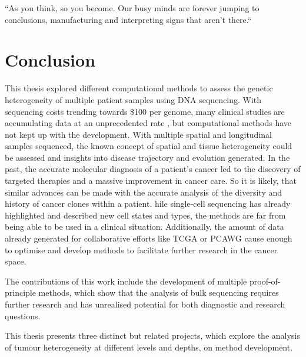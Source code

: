 
\begin{savequote}[85mm]
``As you think, so you become. Our busy minds are forever jumping to conclusions, manufacturing and interpreting signs that aren’t there.``
\end{savequote}


\chapter{Conclusion}
\label{ch:conclusion}
\fancyhead[RE,LO]{\rightmark}

This thesis explored different computational methods to assess the genetic heterogeneity of multiple patient samples using DNA sequencing. With sequencing costs trending towards \$100 per genome, many clinical studies are accumulating data at an unprecedented rate \cite{Stephens2015}, but computational methods have not kept up with the development. With multiple spatial and longitudinal samples sequenced, the known concept of spatial and tissue heterogeneity could be assessed and insights into disease trajectory and evolution generated. In the past, the accurate molecular diagnosis of a patient's cancer led to the discovery of targeted therapies and a massive improvement in cancer care. So it is likely, that similar advances can be made with the accurate analysis of the diversity and history of cancer clones within a patient. hile single-cell sequencing has already highlighted and described new cell states and types, the methods are far from being able to be used in a clinical situation. Additionally, the amount of data already generated for collaborative efforts like TCGA \cite{IPCAWGC2020} or PCAWG  cause enough to optimise and develop methods to facilitate further research in the cancer space.

The contributions of this work include the development of multiple proof-of-principle methods, which show that the analysis of bulk sequencing requires further research and has unrealised potential for both diagnostic and research questions.

This thesis presents three distinct but related projects, which explore the analysis of tumour heterogeneity at different levels and depths,  on method development.


